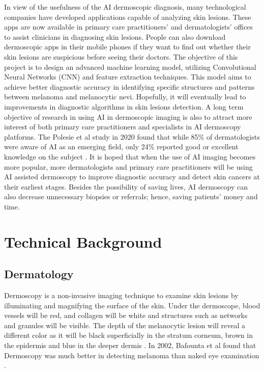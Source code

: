 \documentclass[10pt,twocolumn]{article}
\begin{document}
\newline
\newline
In view of the usefulness of the AI dermoscopic diagnosis, many technological companies have developed applications capable of analyzing skin lesions. These apps are now available in primary care practitioners’ and dermatologists’ offices to assist clinicians in diagnosing skin lesions. People can also download dermoscopic apps in their mobile phones if they want to find out whether their skin lesions are suspicious before seeing their doctors. 
\newline
\newline
The objective of this project is to design an advanced machine learning model, utilizing Convolutional Neural Networks (CNN) and feature extraction techniques. This model aims to achieve better diagnostic accuracy in identifying specific structures and patterns between melanoma and melanocytic nevi. Hopefully, it will eventually lead to improvements in diagnostic algorithms in skin lesions detection.
\newline
\newline
A long term objective of research in using AI in dermoscopic imaging is also to attract more interest of both primary care practitioners and specialists in AI dermoscopy platforms. The Polesie et al study in 2020 found that while 85\% of dermatologists were aware of AI as an emerging field, only 24\% reported good or excellent knowledge on the subject \cite{stiff2022artificial}. It is hoped that when the use of AI imaging becomes more popular, more dermatologists and primary care practitioners will be using AI assisted dermoscopy to improve diagnostic accuracy and detect skin cancers at their earliest stages. Besides the possibility of saving lives, AI dermoscopy can also decrease unnecessary biopsies or referrals; hence, saving patients’ money and time. 
\newline
\section{Technical Background}
\subsection{Dermatology}
Dermoscopy is a non-invasive imaging technique to examine skin lesions by illuminating and magnifying the surface of the skin. Under the dermoscope, blood vessels will be red, and collagen will be white and structures such as networks and granules will be visible. The depth of the melanocytic lesion will reveal a different color as it will be black superficially in the stratum corneum, brown in the epidermis and blue in the deeper dermis \cite{sonthalia2019dermoscopy}. In 2002, Bafounta et al found that Dermoscopy was much better in detecting melanoma than naked eye examination \cite{bafounta2001dermoscopy}.
\end{document}
